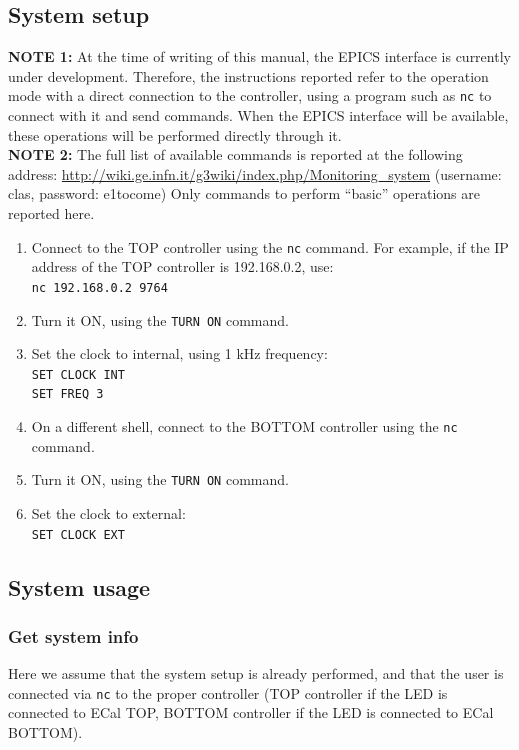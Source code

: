 \documentclass[12pt]{article}
\begin{document}
      \subsection{System setup}

      \textbf{NOTE 1:} At the time of writing of this manual, the EPICS interface is currently under development. Therefore, the instructions reported refer to the operation mode with a direct connection to the controller, using a program such as \texttt{nc} to connect with it and send commands. When the EPICS interface will be available, these operations will be performed directly through it.\\
      \textbf{NOTE 2:} The full list of available commands is reported at the following address: 
      \url{http://wiki.ge.infn.it/g3wiki/index.php/Monitoring_system} 
      (username: clas, password: e1tocome) Only commands to perform ``basic'' operations are reported here. 

      \begin{enumerate}
      \item{Connect to the TOP controller using the \texttt{nc} command. For example, if the IP address of the TOP controller is 192.168.0.2, use:\\
      \texttt{nc 192.168.0.2 9764}}
      \item{Turn it ON, using the \texttt{TURN ON} command.}
      \item{Set the clock to internal, using 1 kHz frequency:\\
      \texttt{SET CLOCK INT}\\
      \texttt{SET FREQ 3}
      }
      \item{On a different shell, connect to the BOTTOM controller using the \texttt{nc} command.}
      \item{Turn it ON, using the \texttt{TURN ON} command.}
      \item{Set the clock to external:\\
      \texttt{SET CLOCK EXT}
      }
      \end{enumerate}

      \subsection{System usage}

      \subsubsection{Get system info}
Here we assume that the system setup is already performed, and that the user is connected via \texttt{nc} to the proper controller (TOP controller if the LED is connected to ECal TOP, BOTTOM controller if the LED is connected to ECal BOTTOM).
\end{document}
